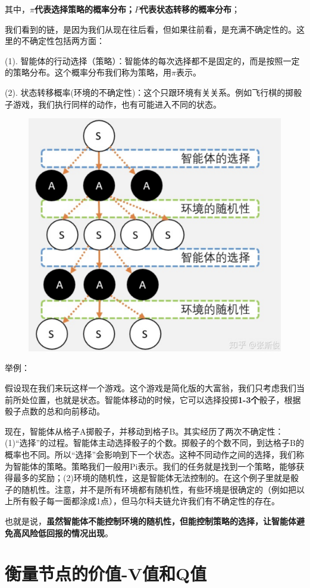 \documentclass[12pt]{article}
\begin{document}
其中，\textbf{$\pi$代表选择策略的概率分布；$P$代表状态转移的概率分布}；

我们看到的链，是因为我们从现在往后看，但如果往前看，是充满不确定性的。这里的不确定性包括两方面：

(1). 智能体的行动选择（策略）：智能体的每次选择都不是固定的，而是按照一定的策略分布。这个概率分布我们称为策略，用$\pi$表示。

(2). 状态转移概率(环境的不确定性)：这个只跟环境有关关系。例如飞行棋的掷骰子游戏，我们执行同样的动作，也有可能进入不同的状态。

\begin{figure}[H]
    \centering
    \includegraphics[width=.5\textwidth]{fig/ReinforcementLearning/RL_Markov_Chain_Tree_Uncertainty.png}
\end{figure}

\begin{framed}
\small{
举例：

假设现在我们来玩这样一个游戏。这个游戏是简化版的大富翁，我们只考虑我们当前所处位置，也就是状态。智能体移动的时候，它可以选择投掷\textbf{1-3个}骰子，根据骰子点数的总和向前移动。

现在，智能体从格子A掷骰子，并移动到格子B。其实经历了两次不确定性：(1)“选择”的过程。智能体主动选择骰子的个数。掷骰子的个数不同，到达格子B的概率也不同。所以“选择”会影响到下一个状态。这种不同动作之间的选择，我们称为智能体的策略。策略我们一般用Pi表示。我们的任务就是找到一个策略，能够获得最多的奖励；(2)环境的随机性，这是智能体无法控制的。在这个例子里就是骰子的随机性。注意，并不是所有环境都有随机性，有些环境是很确定的（例如把以上所有骰子每一面都涂成1点），但马尔科夫链允许我们有不确定性的存在。

也就是说，\textbf{虽然智能体不能控制环境的随机性，但能控制策略的选择，让智能体避免高风险低回报的情况出现}。
}
\end{framed}

\section{衡量节点的价值-V值和Q值\cite{How_To_Understand_Q_V_Value}}
\end{document}
